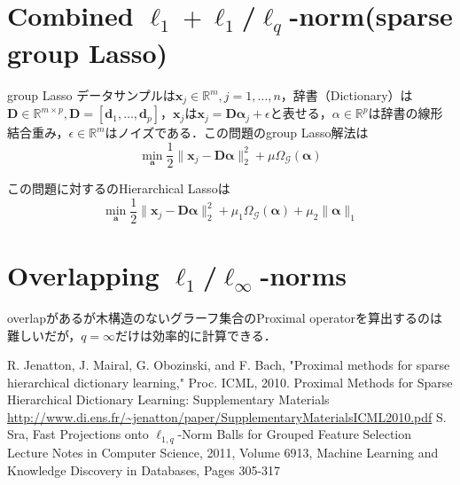 \documentclass[a4paper,11pt]{jsarticle}
\numberwithin{theorem}{section}  %
\numberwithin{equation}{section} %
\begin{document}
\section{Combined $\ell_1+\ell_1$/$\ell_q$-norm(sparse group Lasso)}
\begin{itembox}[l]{group Lasso}
データサンプルは$\bm{x}_j \in \mathbb{R}^m,j=1,\dots,n$，辞書（Dictionary）は$\bm{D}\in \mathbb{R}^{m \times p},\bm{D}=[\bm{d}_1,\dots,\bm{d}_p]$，$\bm{x}_j$は$\bm{x}_j = \bm{D}\bm{\alpha}_j + \epsilon$と表せる，$\alpha \in \mathbb{R}^p$は辞書の線形結合重み，$\epsilon \in \mathbb{R}^m$はノイズである．この問題のgroup Lasso解法は
\begin{equation}
\min_{\bm{a}} \frac{1}{2}\|\bm{x}_j - \bm{D}\bm{\alpha}\|_2^2 + \mu \Omega_{\mathcal{G}}(\bm{\alpha})
\end{equation}
\end{itembox}
この問題に対するのHierarchical Lassoは
\begin{equation}
\min_{\bm{a}} \frac{1}{2}\|\bm{x}_j - \bm{D}\bm{\alpha}\|_2^2 + \mu_1 \Omega_{\mathcal{G}}(\bm{\alpha}) + \mu_2 \|\bm{\alpha}\|_1
\end{equation}

\section{Overlapping $\ell_1$/$\ell_\infty$-norms}
overlapがあるが木構造のないグラーフ集合のProximal operatorを算出するのは難しいだが，$q=\infty$だけは効率的に計算できる．

\begin{thebibliography}{99}
 R. Jenatton, J. Mairal, G. Obozinski, and F. Bach, "Proximal methods for sparse hierarchical dictionary learning," Proc. ICML, 2010. 
 Proximal Methods for Sparse Hierarchical Dictionary Learning: Supplementary Materials\\\url{http://www.di.ens.fr/~jenatton/paper/SupplementaryMaterialsICML2010.pdf}
 S. Sra, Fast Projections onto $\ell_{1,q}$-Norm Balls for Grouped Feature Selection Lecture Notes in Computer Science, 2011, Volume 6913, Machine Learning and Knowledge Discovery in Databases, Pages 305-317

\end{thebibliography}
\end{document}

